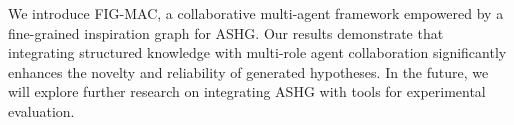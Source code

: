 \documentclass[runningheads]{llncs}
\begin{document}
We introduce FIG-MAC, a collaborative multi-agent framework empowered by a fine-grained inspiration graph for ASHG. Our results demonstrate that integrating structured knowledge with multi-role agent collaboration significantly enhances the novelty and reliability of generated hypotheses. In the future, we will explore further research on integrating ASHG with tools for experimental evaluation.







\end{document}

